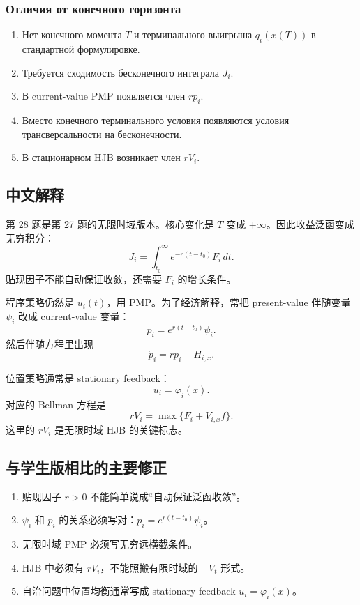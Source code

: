 \documentclass[12pt,a4paper]{article}
\begin{document}
\subsubsection{Отличия от конечного горизонта}

\begin{enumerate}
\item Нет конечного момента $T$ и терминального выигрыша $q_i(x(T))$ в стандартной формулировке.
\item Требуется сходимость бесконечного интеграла $J_i$.
\item В current-value PMP появляется член $r p_i$.
\item Вместо конечного терминального условия появляются условия трансверсальности на бесконечности.
\item В стационарном HJB возникает член $rV_i$.
\end{enumerate}

\subsection{中文解释}

第 28 题是第 27 题的无限时域版本。核心变化是 $T$ 变成 $+\infty$。因此收益泛函变成无穷积分：
\[
 J_i=\int_{t_0}^{\infty}e^{-r(t-t_0)}F_i\,dt.
\]
贴现因子不能自动保证收敛，还需要 $F_i$ 的增长条件。

程序策略仍然是 $u_i(t)$，用 PMP。为了经济解释，常把 present-value 伴随变量 $\psi_i$ 改成 current-value 变量：
\[
 p_i=e^{r(t-t_0)}\psi_i.
\]
然后伴随方程里出现
\[
 \dot p_i=rp_i-H_{i,x}.
\]

位置策略通常是 stationary feedback：
\[
 u_i=\varphi_i(x).
\]
对应的 Bellman 方程是
\[
 rV_i=\max\{F_i+V_{i,x}f\}.
\]
这里的 $rV_i$ 是无限时域 HJB 的关键标志。

\subsection{与学生版相比的主要修正}

\begin{enumerate}
\item 贴现因子 $r>0$ 不能简单说成“自动保证泛函收敛”。
\item $\psi_i$ 和 $p_i$ 的关系必须写对：$p_i=e^{r(t-t_0)}\psi_i$。
\item 无限时域 PMP 必须写无穷远横截条件。
\item HJB 中必须有 $rV_i$，不能照搬有限时域的 $-V_t$ 形式。
\item 自治问题中位置均衡通常写成 stationary feedback $u_i=\varphi_i(x)$。
\end{enumerate}
\end{document}
